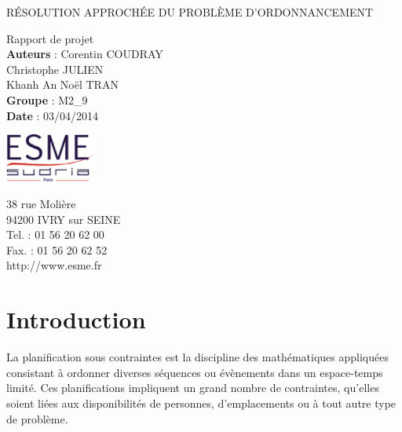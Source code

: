 \documentclass[12pt,a4paper,french]{article}
\begin{document}
\begin{titlepage}
	\begin{center}
		\begin{spacing}{2}
		{ \Huge{ RÉSOLUTION APPROCHÉE DU PROBLÈME D’ORDONNANCEMENT}}\\[1cm]
		\end{spacing}
		{ \Large{Rapport de projet}}\\[10cm]
		
		\textbf{Auteurs} : 
			Corentin COUDRAY \\
			Christophe JULIEN \\
			Khanh An Noël TRAN \\ 
		\textbf{Groupe} : M2\_9\\
		\textbf{Date} : 03/04/2014\\[2 cm]
	\end{center}	
	\vfill 
	\begin{minipage}[b]{0.3\linewidth}
		\includegraphics[width=30mm]{logo.png}
	\end{minipage}
	\hfill
	\begin{minipage}[b]{0.3\linewidth}
		{\footnotesize{38 rue Molière}}\\
		{\footnotesize{94200 IVRY sur SEINE}}\\
		{\footnotesize{Tel. : 01 56 20 62 00}}\\
		{\footnotesize{Fax. : 01 56 20 62 52}}\\
		{\footnotesize{http://www.esme.fr}}
	\end{minipage}
\end{titlepage}


\renewcommand{\contentsname}{Sommaire}
\tableofcontents
\newpage

\section{Introduction}

La planification sous contraintes est la discipline des mathématiques appliquées consistant à ordonner diverses séquences ou évènements dans un espace-temps limité. Ces planifications impliquent un grand nombre de contraintes, qu'elles soient liées aux disponibilités de personnes, d'emplacements ou à tout autre type de problème.\\
\end{document}
